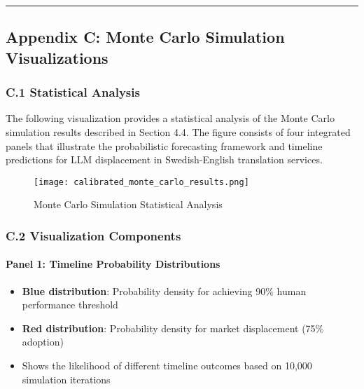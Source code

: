 \documentclass[12pt,a4paper]{article}
\begin{document}
{{{{{\begin{center}\rule{0.5\linewidth}{0.5pt}\end{center}

\hypertarget{appendix-c-monte-carlo-simulation-visualizations}{%
\subsection{Appendix C: Monte Carlo Simulation Visualizations}\label{appendix-c-monte-carlo-simulation-visualizations}}

\hypertarget{statistical-analysis}{%
\subsubsection{C.1 Statistical Analysis}\label{statistical-analysis}}

The following visualization provides a statistical analysis of the Monte Carlo simulation results described in Section 4.4. The figure consists of four integrated panels that illustrate the probabilistic forecasting framework and timeline predictions for LLM displacement in Swedish-English translation services.

\begin{figure}[htbp]
\centering
\texttt{[image: calibrated\_monte\_carlo\_results.png]}
\caption{Monte Carlo Simulation Statistical Analysis}
\label{fig:monte-carlo-results}
\end{figure}

\hypertarget{visualization-components}{%
\subsubsection{C.2 Visualization Components}\label{visualization-components}}

\hypertarget{panel-1-timeline-probability-distributions}{%
\paragraph{Panel 1: Timeline Probability Distributions}\label{panel-1-timeline-probability-distributions}}

\begin{itemize}
\item \textbf{Blue distribution}: Probability density for achieving 90\% human performance threshold
\item \textbf{Red distribution}: Probability density for market displacement (75\% adoption)
\item Shows the likelihood of different timeline outcomes based on 10,000 simulation iterations
\end{itemize}

}}}}}
\end{document}
